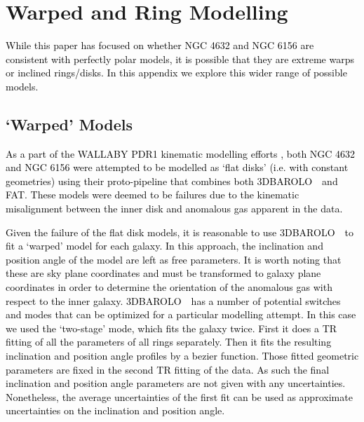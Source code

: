 \documentclass[fleqn,usenatbib]{mnras}
\newcommand{\barolo}{\textsc{3DBAROLO}~}
\begin{document}

%






\appendix





\section{Warped and Ring Modelling}\label{Sec:KinModels}

\textcolor{black}{While this paper has focused on whether NGC 4632 and NGC 6156 are consistent with perfectly polar models, it is possible that they are extreme warps or inclined rings/disks.  In this appendix we explore this wider range of possible models.}

\subsection{`Warped' Models}\label{SubSec:WarpedModelling}

\textcolor{black}{As a part of the WALLABY PDR1 kinematic modelling efforts \citep{Deg2022}, both NGC 4632 and NGC 6156 were attempted to be modelled as `flat disks' (i.e. with constant geometries) using their proto-pipeline that combines both \barolo\ and \textsc{FAT}.  These models were deemed to be failures due to the kinematic misalignment between the inner disk and anomalous gas apparent in the data.  }

\textcolor{black}{Given the failure of the flat disk models, it is reasonable to use \barolo\ to fit a `warped' model for each galaxy.  In this approach, the inclination and position angle of the model are left as free parameters.  It is worth noting that these are sky plane coordinates and must be transformed to galaxy plane coordinates in order to determine the orientation of the anomalous gas with respect to the inner galaxy.  \barolo\ has a number of potential switches and modes that can be optimized for a particular modelling attempt.  In this case we used the `two-stage' mode, which fits the galaxy twice.  First it does a TR fitting of all the parameters of all rings separately. 
 Then it fits the resulting inclination and position angle profiles by a bezier function.  Those fitted geometric parameters are fixed in the second TR fitting of the data.  As such the final inclination and position angle parameters are not given with any uncertainties.   Nonetheless, the average uncertainties of the first fit can be used as approximate uncertainties on the inclination and position angle.}
\end{document}
